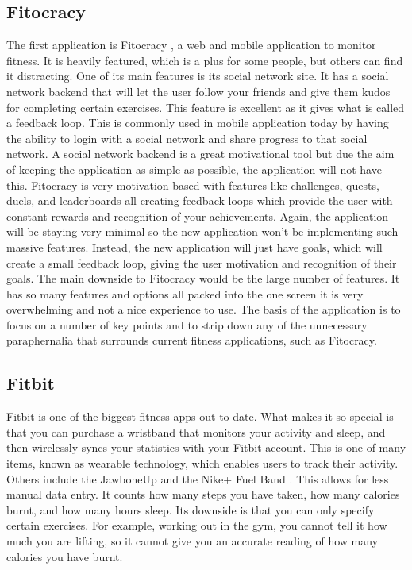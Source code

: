 \subsection{Fitocracy}
The first application is Fitocracy \citep{fitocracy:2007}, a web and mobile application to monitor fitness. It is heavily featured, which is a plus for some people, but others can find it distracting. One of its main features is its social network site. It has a social network backend that will let the user follow your friends and give them kudos for completing certain exercises. This feature is excellent as it gives what is called a feedback loop. This is commonly used in mobile application today by having the ability to login with a social network and share progress to that social network. A social network backend is a great motivational tool but due the aim of keeping the application as simple as possible, the application will not have this. Fitocracy is very motivation based with features like challenges, quests, duels, and leaderboards all creating feedback loops which provide the user with constant rewards and recognition of your achievements. Again, the application will be staying very minimal so the new application won't be implementing such massive features. Instead, the new application will just have goals, which will create a small feedback loop, giving the user motivation and recognition of their goals. The main downside to Fitocracy would be the large number of features. It has so many features and options all packed into the one screen it is very overwhelming and not a nice experience to use. The basis of the application is to focus on a number of key points and to strip down any of the unnecessary paraphernalia that surrounds current fitness applications, such as Fitocracy.


\subsection{Fitbit}
Fitbit is one of the biggest fitness apps out to date. What makes it so special is that you can purchase a wristband that monitors your activity and sleep, and then wirelessly syncs your statistics with your Fitbit account. This is one of many items, known as wearable technology, which enables users to track their activity. Others include the JawboneUp \citep{jawbone:2011} and the Nike+ Fuel Band \citep{nikefuelband:2012}. This allows for less manual data entry. It counts how many steps you have taken, how many calories burnt, and how many hours sleep. Its downside is that you can only specify certain exercises. For example, working out in the gym, you cannot tell it how much you are lifting, so it cannot give you an accurate reading of how many calories you have burnt.\\

